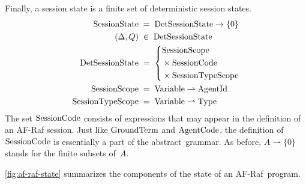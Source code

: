 \documentclass[a4paper,12pt,oneside,fleqn]{book} %
\newcommand{\pmap}{\rightharpoonup}
\begin{document}
{Finally, a session state is a finite set of deterministic session states.
\begin{align}
{\rm SessionState} &\;=\; {\rm DetSessionState}\to\{0\}
\\
(\Delta,Q) &\;\in\;{\rm DetSessionState}
\\
{\rm DetSessionState} &\;=\;
  \left\{
  \begin{aligned}
  &{\rm SessionScope}
    \\&\times{\rm SessionCode}
    \\&\times{\rm SessionTypeScope}
  \end{aligned}
  \right.
\\
{\rm SessionScope} &\;=\; {\rm Variable}\pmap{\rm AgentId}
\\
{\rm SessionTypeScope} &\;=\; {\rm Variable}\pmap{\rm Type}
\end{align}
The set ${\rm SessionCode}$ consists of expressions that may appear in the
definition of an AF-Raf session. Just like ${\rm GroundTerm}$ and ${\rm
AgentCode}$, the definition of ${\rm SessionCode}$ is essentially a part of
the abstract~grammar.  As before, $A\pmap\{0\}$ stands for the finite
subsets of~$A$.

\autoref{fig:af-raf-state} summarizes the components of the state of an
AF-Raf~program.

}
\end{document}
